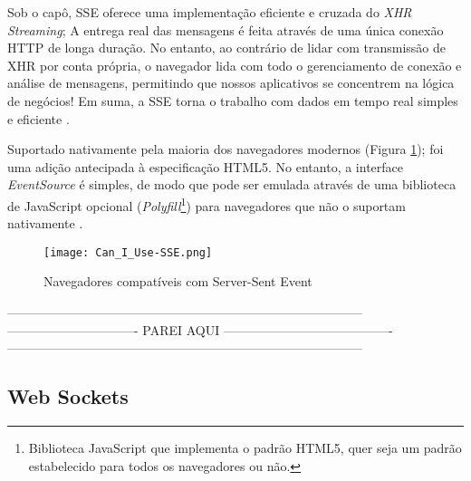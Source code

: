 \begin{citacao}
	Sob o capô, SSE oferece uma implementação eficiente e cruzada do \emph{XHR Streaming}; A entrega real das mensagens é feita através de uma única conexão HTTP de longa duração. No entanto, ao contrário de lidar com transmissão de XHR por conta própria, o navegador lida com todo o gerenciamento de conexão e análise de mensagens, permitindo que nossos aplicativos se concentrem na lógica de negócios! Em suma, a SSE torna o trabalho com dados em tempo real simples e eficiente \cite[P.~279]{grigorik2013high}.
\end{citacao}

Suportado nativamente pela maioria dos navegadores modernos (Figura \ref{fig:sse}); foi uma adição antecipada à especificação HTML5. No entanto, a interface \emph{EventSource} é simples, de modo que pode ser emulada através de uma biblioteca de JavaScript opcional (\emph{Polyfill}\footnote{Biblioteca JavaScript que implementa o padrão HTML5, quer seja um padrão estabelecido para todos os navegadores ou não.}) para navegadores que não o suportam nativamente \cite{grigorik2013high}.

\begin{figure}[!htb]
	\centering
	\texttt{[image: Can\_I\_Use-SSE.png]}
	\caption{Navegadores compatíveis com Server-Sent Event}
	\label{fig:sse}
\end{figure}

------------------------------------------------------------------------------------
------------------------------- PAREI AQUI ----------------------------------------
------------------------------------------------------------------------------------

\subsection{Web Sockets}

